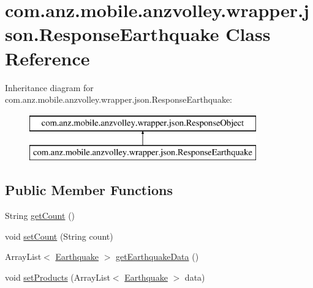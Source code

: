 \hypertarget{classcom_1_1anz_1_1mobile_1_1anzvolley_1_1wrapper_1_1json_1_1_response_earthquake}{\section{com.\+anz.\+mobile.\+anzvolley.\+wrapper.\+json.\+Response\+Earthquake Class Reference}
\label{classcom_1_1anz_1_1mobile_1_1anzvolley_1_1wrapper_1_1json_1_1_response_earthquake}
}
Inheritance diagram for com.\+anz.\+mobile.\+anzvolley.\+wrapper.\+json.\+Response\+Earthquake\+:\begin{figure}[H]
\begin{center}
\leavevmode
\includegraphics[height=2.000000cm]{classcom_1_1anz_1_1mobile_1_1anzvolley_1_1wrapper_1_1json_1_1_response_earthquake}
\end{center}
\end{figure}
\subsection*{Public Member Functions}
\begin{DoxyCompactItemize}
\item 
String \hyperlink{classcom_1_1anz_1_1mobile_1_1anzvolley_1_1wrapper_1_1json_1_1_response_earthquake_a9f259f33d3f075b10956e51490408e91}{get\+Count} ()
\item 
void \hyperlink{classcom_1_1anz_1_1mobile_1_1anzvolley_1_1wrapper_1_1json_1_1_response_earthquake_a665a16fe56804efb553cea312b52cf07}{set\+Count} (String count)
\item 
Array\+List$<$ \hyperlink{classcom_1_1anz_1_1mobile_1_1anzvolley_1_1wrapper_1_1model_1_1_earthquake}{Earthquake} $>$ \hyperlink{classcom_1_1anz_1_1mobile_1_1anzvolley_1_1wrapper_1_1json_1_1_response_earthquake_abcca2448b420c5edad7b81c95293222a}{get\+Earthquake\+Data} ()
\item 
void \hyperlink{classcom_1_1anz_1_1mobile_1_1anzvolley_1_1wrapper_1_1json_1_1_response_earthquake_a272fbe1a207d0bf9cdc2b535128a3e02}{set\+Products} (Array\+List$<$ \hyperlink{classcom_1_1anz_1_1mobile_1_1anzvolley_1_1wrapper_1_1model_1_1_earthquake}{Earthquake} $>$ data)
\end{DoxyCompactItemize}


